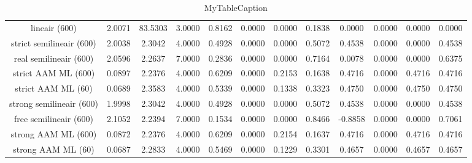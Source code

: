 \begin{table}
\centering
\begin{tabular}{|c|c|c|c|c|c|c|c|c|c|c|c|}
\hline
 &  &  &  &  &  &  &  &  &  &  &  \\
\hline
lineair (600) & 2.0071 & 83.5303 & 3.0000 & 0.8162 & 0.0000 & 0.0000 & 0.1838 & 0.0000 & 0.0000 & 0.0000 & 0.0000 \\
\hline
strict semilineair (600) & 2.0038 & 2.3042 & 4.0000 & 0.4928 & 0.0000 & 0.0000 & 0.5072 & 0.4538 & 0.0000 & 0.0000 & 0.4538 \\
\hline
real semilineair (600) & 2.0596 & 2.2637 & 7.0000 & 0.2836 & 0.0000 & 0.0000 & 0.7164 & 0.0078 & 0.0000 & 0.0000 & 0.6375 \\
\hline
strict AAM ML (600) & 0.0897 & 2.2376 & 4.0000 & 0.6209 & 0.0000 & 0.2153 & 0.1638 & 0.4716 & 0.0000 & 0.4716 & 0.4716 \\
\hline
strict AAM ML (60) & 0.0689 & 2.3583 & 4.0000 & 0.5339 & 0.0000 & 0.1338 & 0.3323 & 0.4750 & 0.0000 & 0.4750 & 0.4750 \\
\hline
strong semilineair (600) & 1.9998 & 2.3042 & 4.0000 & 0.4928 & 0.0000 & 0.0000 & 0.5072 & 0.4538 & 0.0000 & 0.0000 & 0.4538 \\
\hline
free semilineair (600) & 2.1052 & 2.2394 & 7.0000 & 0.1534 & 0.0000 & 0.0000 & 0.8466 & -0.8858 & 0.0000 & 0.0000 & 0.7061 \\
\hline
strong AAM ML (600) & 0.0872 & 2.2376 & 4.0000 & 0.6209 & 0.0000 & 0.2154 & 0.1637 & 0.4716 & 0.0000 & 0.4716 & 0.4716 \\
\hline
strong AAM ML (60) & 0.0687 & 2.2833 & 4.0000 & 0.5469 & 0.0000 & 0.1229 & 0.3301 & 0.4657 & 0.0000 & 0.4657 & 0.4657 \\
\hline
\end{tabular}
\caption{MyTableCaption}
\label{table:MyTableLabel}
\end{table}
